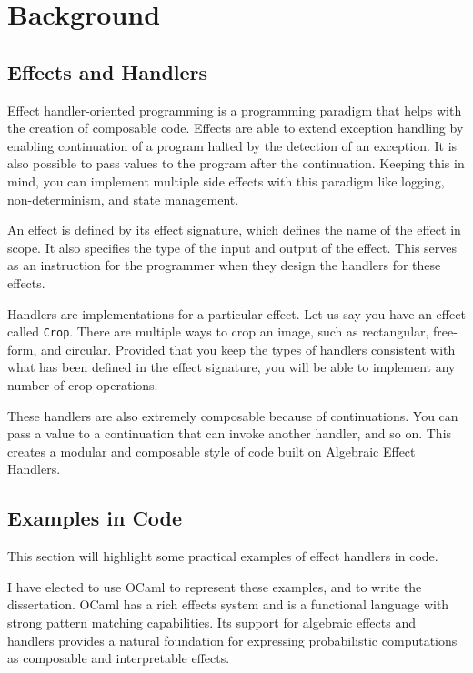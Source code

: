 \documentclass[logo,bsc,singlespacing,parskip,online]{infthesis}
\begin{document}
\chapter{Background}

\section{Effects and Handlers}

Effect handler-oriented programming is a programming paradigm that helps with the creation of composable code. Effects are able to extend exception handling by enabling continuation of a program halted by the detection of an exception. It is also possible to pass values to the program after the continuation. Keeping this in mind, you can implement multiple side effects with this paradigm like logging, non-determinism, and state management.

An effect is defined by its effect signature, which defines the name of the effect in scope. It also specifies the type of the input and output of the effect. This serves as an instruction for the programmer when they design the handlers for these effects. 

Handlers are implementations for a particular effect. Let us say you have an effect called \texttt{Crop}. There are multiple ways to crop an image, such as rectangular, free-form, and circular. Provided that you keep the types of handlers consistent with what has been defined in the effect signature, you will be able to implement any number of crop operations.

These handlers are also extremely composable because of continuations. You can pass a value to a continuation that can invoke another handler, and so on. This creates a modular and composable style of code built on Algebraic Effect Handlers. 

\section{Examples in Code}

This section will highlight some practical examples of effect handlers in code. 

I have elected to use OCaml to represent these examples, and to write the dissertation. OCaml has a rich effects system and is a functional language with strong pattern matching capabilities. Its support for algebraic effects and handlers provides a natural foundation for expressing probabilistic computations as composable and interpretable effects.
\end{document}
